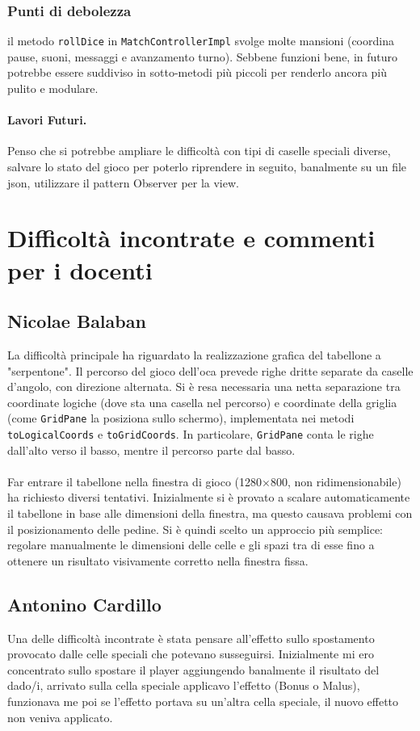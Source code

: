 \documentclass[a4paper,12pt]{report}
\begin{document}
\subsubsection{Punti di debolezza}
il metodo \texttt{rollDice} in \texttt{MatchControllerImpl} svolge molte mansioni (coordina pause, suoni, messaggi e avanzamento turno). Sebbene funzioni bene, in futuro potrebbe essere suddiviso in sotto-metodi più piccoli per renderlo ancora più pulito e modulare.
\paragraph{Lavori Futuri.}
Penso che si potrebbe ampliare le difficoltà con tipi di caselle speciali diverse, salvare lo stato del gioco per poterlo riprendere in seguito, banalmente su un file json, utilizzare il pattern Observer per la view. 

\section{Difficoltà incontrate e commenti per i docenti}
\subsection{Nicolae Balaban}
La difficoltà principale ha riguardato la realizzazione grafica del tabellone a "serpentone". Il percorso del gioco dell'oca prevede righe dritte separate da caselle d'angolo, con direzione alternata. Si è resa necessaria una netta separazione tra coordinate logiche (dove sta una casella nel percorso) e coordinate della griglia (come \texttt{GridPane} la posiziona sullo schermo), implementata nei metodi \texttt{toLogicalCoords} e \texttt{toGridCoords}. In particolare, \texttt{GridPane} conta le righe dall'alto verso il basso, mentre il percorso parte dal basso.\\
\\
Far entrare il tabellone nella finestra di gioco (1280×800, non ridimensionabile) ha richiesto diversi tentativi. Inizialmente si è provato a scalare automaticamente il tabellone in base alle dimensioni della finestra, ma questo causava problemi con il posizionamento delle pedine. Si è quindi scelto un approccio più semplice: regolare manualmente le dimensioni delle celle e gli spazi tra di esse fino a ottenere un risultato visivamente corretto nella finestra fissa.

\subsection{Antonino Cardillo}
Una delle difficoltà incontrate è stata pensare all'effetto sullo spostamento provocato dalle celle speciali che potevano susseguirsi. Inizialmente mi ero concentrato sullo spostare il player aggiungendo banalmente il risultato del dado/i, arrivato sulla cella speciale applicavo l'effetto (Bonus o Malus), funzionava me poi se l'effetto portava su un'altra cella speciale, il nuovo effetto non veniva applicato.
\end{document}
